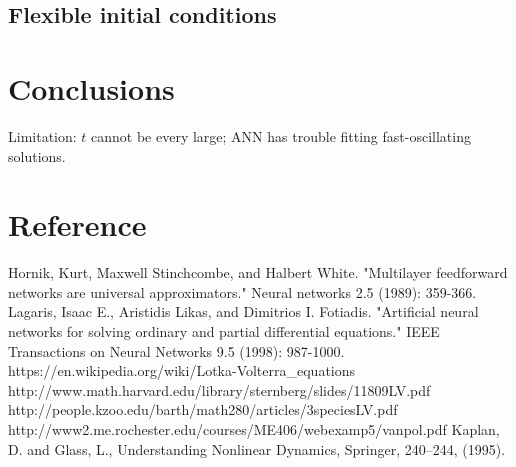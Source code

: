 \documentclass[11pt]{article}
\begin{document}
\subsection{Flexible initial conditions}


\section{Conclusions}

Limitation: $t$ cannot be every large; ANN has trouble fitting fast-oscillating solutions.

\section{Reference}

\begin{thebibliography}{99}

Hornik, Kurt, Maxwell Stinchcombe, and Halbert White. "Multilayer feedforward networks are universal approximators." Neural networks 2.5 (1989): 359-366.
Lagaris, Isaac E., Aristidis Likas, and Dimitrios I. Fotiadis. "Artificial neural networks for solving ordinary and partial differential equations." IEEE Transactions on Neural Networks 9.5 (1998): 987-1000.
https://en.wikipedia.org/wiki/Lotka-Volterra\_equations
http://www.math.harvard.edu/library/sternberg/slides/11809LV.pdf
http://people.kzoo.edu/barth/math280/articles/3speciesLV.pdf
http://www2.me.rochester.edu/courses/ME406/webexamp5/vanpol.pdf
Kaplan, D. and Glass, L., Understanding Nonlinear Dynamics, Springer, 240–244, (1995).

\end{thebibliography}
\end{document}
